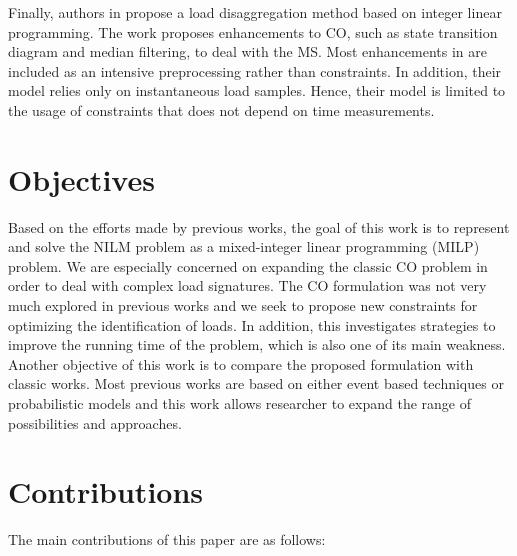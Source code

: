Finally, authors in \cite{bhotto2016} propose a load disaggregation method based on integer linear programming. The work proposes enhancements to CO, such as state transition diagram and median filtering, to deal with the MS. Most enhancements in \cite{bhotto2016} are included as an intensive preprocessing rather than constraints. In addition, their model relies only on instantaneous load samples. Hence, their model is limited to the usage of constraints that does not depend on time measurements.

\section{Objectives}

Based on the efforts made by previous works, the goal of this work is to represent and solve the NILM problem as a mixed-integer linear programming (MILP) problem. We are especially concerned on expanding the classic CO problem in order to deal with complex load signatures. The CO formulation was not very much explored in previous works and we seek to propose new constraints for optimizing the identification of loads. In addition, this investigates strategies to improve the running time of the problem, which is also one of its main weakness. Another objective of this work is to compare the proposed formulation with classic works. Most previous works are based on either event based techniques or probabilistic models and this work allows researcher to expand the range of possibilities and approaches.


\section{Contributions}

The main contributions of this paper are as follows:

